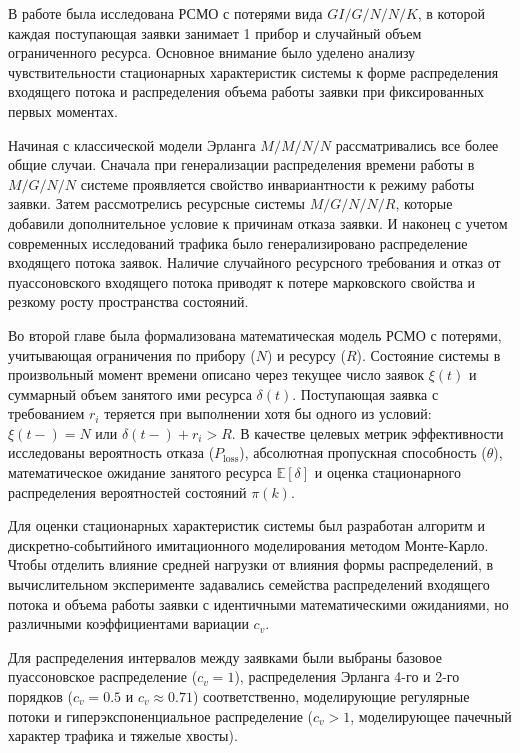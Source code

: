 В работе была исследована РСМО с потерями вида $GI/G/N/N/K$, в которой каждая поступающая заявки занимает 1 прибор и случайный объем ограниченного ресурса. Основное внимание было уделено анализу чувствительности стационарных характеристик системы к форме распределения входящего потока и распределения объема работы заявки при фиксированных первых моментах.

Начиная с классической модели Эрланга $M/M/N/N$ рассматривались все более общие случаи. Сначала при генерализации распределения времени работы в $M/G/N/N$ системе проявляется свойство инвариантности к режиму работы заявки. Затем рассмотрелись ресурсные системы $M/G/N/N/R$, которые добавили дополнительное условие к причинам отказа заявки. И наконец с учетом современных исследований трафика было генерализировано распределение входящего потока заявок. Наличие случайного ресурсного требования и отказ от пуассоновского входящего потока приводят к потере марковского свойства и резкому росту пространства состояний.

Во второй главе была формализована математическая модель РСМО с потерями, учитывающая ограничения по прибору ($N$) и ресурсу ($R$). Состояние системы в произвольный момент времени описано через текущее число заявок $\xi(t)$ и суммарный объем занятого ими ресурса $\delta(t)$. Поступающая заявка с требованием $r_i$ теряется при выполнении хотя бы одного из условий: $\xi(t-) = N$ или $\delta(t-) + r_i > R$. В качестве целевых метрик эффективности исследованы вероятность отказа ($P_{\mathrm{loss}}$), абсолютная пропускная способность ($\theta$), математическое ожидание занятого ресурса $\mathbb{E}[\delta]$ и оценка стационарного распределения вероятностей состояний $\pi(k)$. 

Для оценки стационарных характеристик системы был разработан алгоритм и дискретно-событийного имитационного моделирования методом Монте-Карло. Чтобы отделить влияние средней нагрузки от влияния формы распределений, в вычислительном эксперименте задавались семейства распределений входящего потока и объема работы заявки с идентичными математическими ожиданиями, но различными коэффициентами вариации $c_v$. 

Для распределения интервалов между заявками были выбраны базовое пуассоновское распределение ($c_v = 1$), распределения Эрланга 4-го и 2-го порядков ($c_v = 0.5$ и $c_v \approx 0.71$) соответственно, моделирующие регулярные потоки и гиперэкспоненциальное распределение ($c_v > 1$, моделирующее пачечный характер трафика и тяжелые хвосты).


